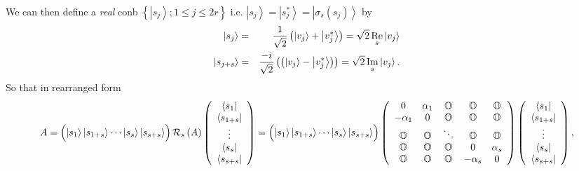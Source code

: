 \begin{definition}
We can then define a {\em real} conb $\left\{ \left\vert s_{j}\right\rangle
;1\leq j\leq 2r\right\} $ i.e. $\left\vert s_{j}\right\rangle =\left\vert
s_{j}^{\ast }\right\rangle =\left\vert \sigma _{s}\left( s_{j}\right)
\right\rangle $ by 
\begin{eqnarray}
\left\vert s_{j}\right\rangle &=&\frac{1}{\sqrt{2}}\left( \left\vert
v_{j}\right\rangle +\left\vert v_{j}^{\ast }\right\rangle \right) =\sqrt{2}%
\mathop{\rm Re}%
_{s}\left\vert v_{j}\right\rangle  \nonumber \\
\left\vert s_{j+s}\right\rangle &=&\frac{-i}{\sqrt{2}}\left( \left(
\left\vert v_{j}\right\rangle -\left\vert v_{j}^{\ast }\right\rangle \right)
\right) =\sqrt{2}%
\mathop{\rm Im}%
_{s}\left\vert v_{j}\right\rangle .
\end{eqnarray}%
So that in rearranged form%
\begin{equation}
A=\left( \stackrel{}{\left\vert s_{1}\right\rangle \left\vert
s_{1+s}\right\rangle \cdots \left\vert s_{s}\right\rangle \left\vert
s_{s+s}\right\rangle }\right) {\cal R}_{s}\left( A\right) \left( 
\begin{array}{c}
\left\langle s_{1}\right\vert \\ 
\left\langle s_{1+s}\right\vert \\ 
\vdots \\ 
\left\langle s_{s}\right\vert \\ 
\left\langle s_{s+s}\right\vert%
\end{array}%
\right) =\left( \stackrel{}{\left\vert s_{1}\right\rangle \left\vert
s_{1+s}\right\rangle \cdots \left\vert s_{s}\right\rangle \left\vert
s_{s+s}\right\rangle }\right) \left( 
\begin{array}{ccccc}
0 & \alpha _{1} & {\Bbb O} & {\Bbb O} & {\Bbb O} \\ 
-\alpha _{1} & 0 & {\Bbb O} & {\Bbb O} & {\Bbb O} \\ 
{\Bbb O} & {\Bbb O} & \ddots & {\Bbb O} & {\Bbb O} \\ 
{\Bbb O} & {\Bbb O} & {\Bbb O} & 0 & \alpha _{s} \\ 
{\Bbb O} & {\Bbb O} & {\Bbb O} & -\alpha _{s} & 0%
\end{array}%
\right) \left( 
\begin{array}{c}
\left\langle s_{1}\right\vert \\ 
\left\langle s_{1+s}\right\vert \\ 
\vdots \\ 
\left\langle s_{s}\right\vert \\ 
\left\langle s_{s+s}\right\vert%
\end{array}%
\right) ,
\end{equation}
\end{definition}

